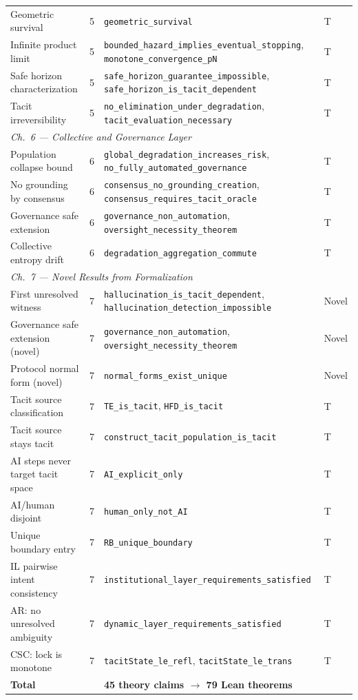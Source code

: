 \begin{center}
\begin{tabular}{p{4.5cm}lp{4.8cm}l}
Geometric survival
  & 5 & \texttt{geometric\_survival}                & T \\
Infinite product limit
  & 5 & \texttt{bounded\_hazard\_implies\_eventual\_stopping}, \texttt{monotone\_convergence\_pN} & T \\
Safe horizon characterization
  & 5 & \texttt{safe\_horizon\_guarantee\_impossible}, \texttt{safe\_horizon\_is\_tacit\_dependent} & T \\
Tacit irreversibility
  & 5 & \texttt{no\_elimination\_under\_degradation}, \texttt{tacit\_evaluation\_necessary} & T \\
\midrule
\multicolumn{4}{l}{\textit{Ch.~6 — Collective and Governance Layer}} \\[2pt]
Population collapse bound
  & 6 & \texttt{global\_degradation\_increases\_risk}, \texttt{no\_fully\_automated\_governance} & T \\
No grounding by consensus
  & 6 & \texttt{consensus\_no\_grounding\_creation}, \texttt{consensus\_requires\_tacit\_oracle} & T \\
Governance safe extension
  & 6 & \texttt{governance\_non\_automation}, \texttt{oversight\_necessity\_theorem} & T \\
Collective entropy drift
  & 6 & \texttt{degradation\_aggregation\_commute}  & T \\
\midrule
\multicolumn{4}{l}{\textit{Ch.~7 — Novel Results from Formalization}} \\[2pt]
First unresolved witness
  & 7 & \texttt{hallucination\_is\_tacit\_dependent}, \texttt{hallucination\_detection\_impossible} & Novel \\
Governance safe extension (novel)
  & 7 & \texttt{governance\_non\_automation}, \texttt{oversight\_necessity\_theorem} & Novel \\
Protocol normal form (novel)
  & 7 & \texttt{normal\_forms\_exist\_unique}       & Novel \\
Tacit source classification
  & 7 & \texttt{TE\_is\_tacit}, \texttt{HFD\_is\_tacit} & T \\
Tacit source stays tacit
  & 7 & \texttt{construct\_tacit\_population\_is\_tacit} & T \\
AI steps never target tacit space
  & 7 & \texttt{AI\_explicit\_only}                 & T \\
AI/human disjoint
  & 7 & \texttt{human\_only\_not\_AI}               & T \\
Unique boundary entry
  & 7 & \texttt{RB\_unique\_boundary}               & T \\
IL pairwise intent consistency
  & 7 & \texttt{institutional\_layer\_requirements\_satisfied} & T \\
AR: no unresolved ambiguity
  & 7 & \texttt{dynamic\_layer\_requirements\_satisfied} & T \\
CSC: lock is monotone
  & 7 & \texttt{tacitState\_le\_refl}, \texttt{tacitState\_le\_trans} & T \\
\midrule
\textbf{Total} & & \textbf{45 theory claims $\to$ 79 Lean theorems} & \\
\bottomrule
\end{tabular}
\end{center}

